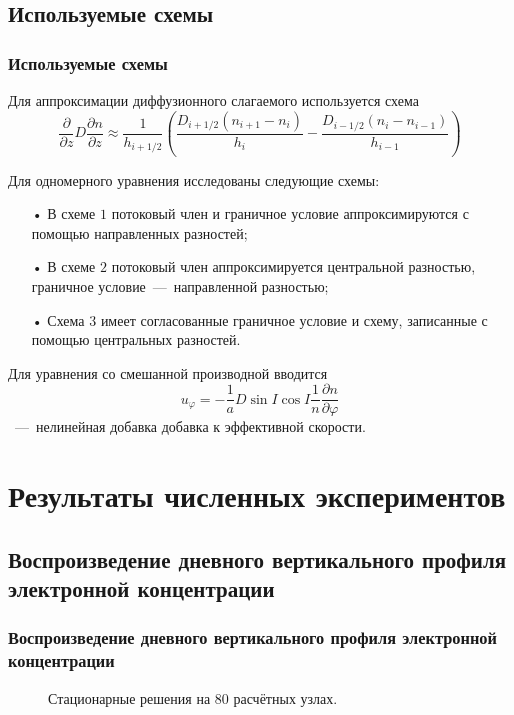 \documentclass[9pt, apectratio=43,unicode]{beamer}
\begin{document}
\subsection{Используемые схемы}
\begin{frame}\frametitle{Используемые схемы}
Для аппроксимации диффузионного слагаемого используется схема $$\dfrac{\partial}{\partial z}D\dfrac{\partial n}{\partial z} \approx \dfrac{1}{h_{i+1/2}}\left(\dfrac{D_{i+1/2}(n_{i+1}-n_i)}{h_i}-\dfrac{D_{i-1/2}(n_{i}-n_{i-1})}{h_{i-1}}\right)$$

Для одномерного уравнения исследованы следующие схемы:

\begin{itemize}
\item[•] В схеме $1$ потоковый член и граничное условие аппроксимируются с помощью направленных разностей; 
\item[•] В схеме $2$ потоковый член аппроксимируется центральной разностью, граничное условие~---~направленной разностью;
\item[•] Схема $3$ имеет согласованные граничное условие и схему, записанные с помощью центральных разностей.
\end{itemize}

Для уравнения со смешанной производной вводится $$u_\varphi=-\dfrac{1}{a}D\sin I \cos I\dfrac{1}{n}\dfrac{\partial n}{\partial \varphi}$$~---~нелинейная добавка добавка к эффективной скорости.
\end{frame}


\section{Результаты численных экспериментов}
\subsection{Воспроизведение дневного вертикального профиля электронной концентрации}
\begin{frame}\frametitle{Воспроизведение дневного вертикального профиля электронной концентрации}

\begin{figure}[H]
\caption{Стационарные решения на $80$ расчётных узлах.}
\end{figure}
\end{frame}
\end{document}
